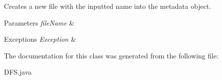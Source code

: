 Creates a new file with the inputted name into the metadata object. 
\begin{DoxyParams}{Parameters}
{\em file\+Name} & \\
\hline
\end{DoxyParams}

\begin{DoxyExceptions}{Exceptions}
{\em Exception} & \\
\hline
\end{DoxyExceptions}


The documentation for this class was generated from the following file\+:\begin{DoxyCompactItemize}
\item 
D\+F\+S.\+java\end{DoxyCompactItemize}
